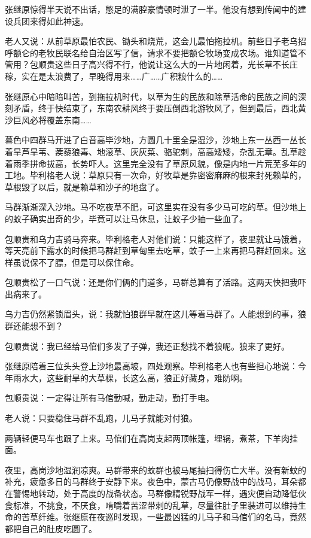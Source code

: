 \par 张继原惊得半天说不出话，憋足的满腔豪情顿时泄了一半。他没有想到传闻中的建设兵团来得如此神速。
\par 老人又说：从前草原最怕农民、锄头和烧荒，这会儿最怕拖拉机。前些日子老乌招呼额仑的老牧民联名给自治区写了信，请求不要把额仑牧场变成农场。谁知道管不管用？包顺贵这些日子高兴得不行，他说让这么大的一片地闲着，光长草不长庄稼，实在是太浪费了，早晚得用来……广……广积粮什么的……
\par 张继原心中暗暗叫苦，到拖拉机时代，以草为生的民族和除草活命的民族之间的深刻矛盾，终于快结束了，东南农耕风终于要压倒西北游牧风了，但到最后，西北黄沙巨风必将覆盖东南……
\par 暮色中四群马开进了白音高毕沙地，方圆几十里全是湿沙，沙地上东一丛西一丛长着旱芦旱苇、蒺藜狼毒、地滚草、灰灰菜、骆驼刺，高高矮矮，杂乱无章。乱草趁着雨季拼命拔高，长势吓人。这里完全没有了草原风貌，像是内地一片荒芜多年的工地。毕利格老人说：草原只有一次命，好牧草是靠密密麻麻的根来封死赖草的，草根毁了以后，就是赖草和沙子的地盘了。
\par 马群渐渐深入沙地。马不吃夜草不肥，可这里实在没有多少马可吃的草。但沙地上的蚊子确实出奇的少，毕竟可以让马休息，让蚊子少抽一些血了。
\par 包顺贵和乌力吉骑马奔来。毕利格老人对他们说：只能这样了，夜里就让马饿着，等天亮前下露水的时候把马群赶到草甸里去吃草，蚊子一上来再把马群赶回来。这样虽说保不了膘，但是可以保住命。
\par 包顺贵松了一口气说：还是你们俩的门道多，马群总算有了活路。这两天快把我吓出病来了。
\par 乌力吉仍然紧锁眉头，说：我就怕狼群早就在这儿等着马群了。人能想到的事，狼群还能想不到？
\par 包顺贵说：我已经给马倌们多发了子弹，我还正愁找不着狼呢。狼来了更好。
\par 张继原陪着三位头头登上沙地最高坡，四处观察。毕利格老人也有些担心地说：今年雨水大，这些耐旱的大草棵，长这么高，狼正好藏身，难防啊。
\par 包顺贵说：一定得让所有马倌勤喊，勤走动，勤打手电。
\par 老人说：只要稳住马群不乱跑，儿马子就能对付狼。
\par 两辆轻便马车也跟了上来。马倌们在高岗支起两顶帐篷，埋锅，煮茶，下羊肉挂面。
\par 夜里，高岗沙地湿润凉爽。马群带来的蚊群也被马尾抽扫得伤亡大半。没有新蚊的补充，疲惫多日的马群终于安静下来。夜色中，蒙古马仍像野战中的战马，耳朵都在警惕地转动，处于高度的战备状态。马群像精锐野战军一样，遇灾便自动降低伙食标准，不挑食，不厌食，啃嚼着苦涩带刺的乱草，尽量往肚子里装进可以维持生命的苦草纤维。张继原在夜巡时发现，一些最凶猛的儿马子和马倌们的名马，竟然都把自己的肚皮吃圆了。
